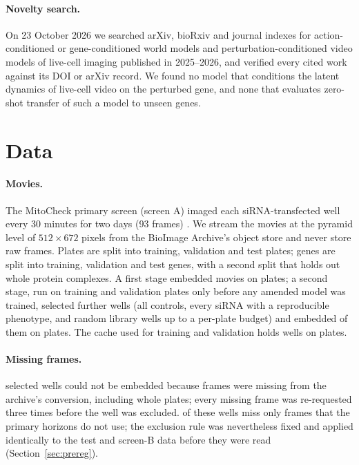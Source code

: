 \paragraph{Novelty search.} On 23 October 2026 we searched arXiv, bioRxiv and journal indexes for
action-conditioned or gene-conditioned world models and perturbation-conditioned video models of
live-cell imaging published in 2025--2026, and verified every cited work against its DOI or
arXiv record. We found no model that conditions the latent dynamics of live-cell video on the
perturbed gene, and none that evaluates zero-shot transfer of such a model to unseen genes.

\section{Data}\label{sec:data}

\paragraph{Movies.} The MitoCheck primary screen (screen A) imaged each siRNA-transfected well
every 30 minutes for two days (93 frames) \citep{neumann2010mitocheck}. We stream the movies at
the pyramid level of $512\times672$ pixels from the BioImage Archive's object store and never store
raw frames. Plates are split into \NPlatesTrain{} training, \NPlatesVal{} validation and
\NPlatesTest{} test plates; genes are split into \NGenesTrain{} training, \NGenesVal{} validation and
\NGenesTest{} test genes, with a second split that holds out whole protein complexes. A first
stage embedded \NMoviesStageOne{} movies on \NPlatesStageOne{} plates; a second stage, run on
training and validation plates only before any amended model was trained, selected
\NWellsStageTwoSelected{} further wells (all controls, every siRNA with a reproducible
phenotype, and random library wells up to a per-plate budget) and embedded
\NWellsStageTwoEmbedded{} of them on \NPlatesStageTwoEmbedded{} plates. The cache used for
training and validation holds \NCacheWells{} wells on \NCachePlates{} plates.

\paragraph{Missing frames.} \NWellsMissingFrames{} selected wells could not be embedded because
frames were missing from the archive's conversion, including \NWholePlatesMissing{} whole plates;
every missing frame was re-requested three times before the well was excluded. \NWellsMissingOnlyLate{}
of these wells miss only frames that the primary horizons do not use; the exclusion rule was
nevertheless fixed and applied identically to the test and screen-B data before they were read
(Section~\ref{sec:prereg}).

